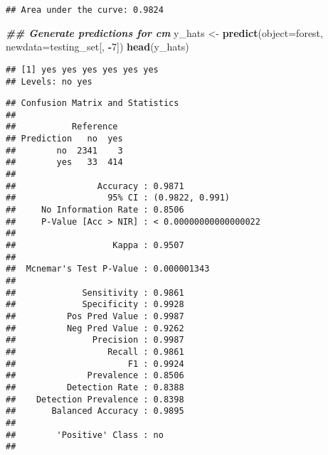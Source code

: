 \documentclass[
]{article}
\newenvironment{Shaded}{\begin{snugshade}}{\end{snugshade}}
\newcommand{\AttributeTok}[1]{\textcolor[rgb]{0.13,0.29,0.53}{#1}}
\newcommand{\DecValTok}[1]{\textcolor[rgb]{0.00,0.00,0.81}{#1}}
\newcommand{\DocumentationTok}[1]{\textcolor[rgb]{0.56,0.35,0.01}{\textbf{\textit{#1}}}}
\newcommand{\FunctionTok}[1]{\textcolor[rgb]{0.13,0.29,0.53}{\textbf{#1}}}
\newcommand{\NormalTok}[1]{#1}
\newcommand{\OtherTok}[1]{\textcolor[rgb]{0.56,0.35,0.01}{#1}}
\newcommand{\SpecialCharTok}[1]{\textcolor[rgb]{0.81,0.36,0.00}{\textbf{#1}}}
\newcommand{\StringTok}[1]{\textcolor[rgb]{0.31,0.60,0.02}{#1}}
\begin{document}
\begin{verbatim}
## Area under the curve: 0.9824
\end{verbatim}

\begin{Shaded}
\begin{Highlighting}[]
\DocumentationTok{\#\# Generate predictions for cm}
\NormalTok{y\_hats }\OtherTok{\textless{}{-}} \FunctionTok{predict}\NormalTok{(}\AttributeTok{object=}\NormalTok{forest,  }\AttributeTok{newdata=}\NormalTok{testing\_set[, }\SpecialCharTok{{-}}\DecValTok{7}\NormalTok{])}
\FunctionTok{head}\NormalTok{(y\_hats)}
\end{Highlighting}
\end{Shaded}

\begin{verbatim}
## [1] yes yes yes yes yes yes
## Levels: no yes
\end{verbatim}

\begin{Shaded}
\end{Shaded}

\begin{verbatim}
## Confusion Matrix and Statistics
## 
##           Reference
## Prediction   no  yes
##        no  2341    3
##        yes   33  414
##                                                
##                Accuracy : 0.9871               
##                  95% CI : (0.9822, 0.991)      
##     No Information Rate : 0.8506               
##     P-Value [Acc > NIR] : < 0.00000000000000022
##                                                
##                   Kappa : 0.9507               
##                                                
##  Mcnemar's Test P-Value : 0.000001343          
##                                                
##             Sensitivity : 0.9861               
##             Specificity : 0.9928               
##          Pos Pred Value : 0.9987               
##          Neg Pred Value : 0.9262               
##               Precision : 0.9987               
##                  Recall : 0.9861               
##                      F1 : 0.9924               
##              Prevalence : 0.8506               
##          Detection Rate : 0.8388               
##    Detection Prevalence : 0.8398               
##       Balanced Accuracy : 0.9895               
##                                                
##        'Positive' Class : no                   
## 
\end{verbatim}
\end{document}
